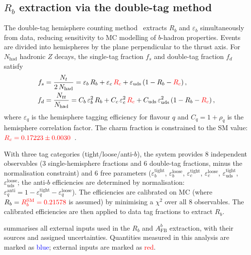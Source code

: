 \documentclass[11pt,a4paper]{article}
\newcommand{\measured}[1]{\textcolor{blue}{#1}}
\newcommand{\external}[1]{\textcolor{red}{#1}}
\begin{document}
\subsection{$R_b$ extraction via the double-tag method}
\label{sec:corrections:Rb}

The double-tag hemisphere counting method~\cite{LEP:HF:2001,ALEPH:Rb:1996}
extracts $R_b$ and $\varepsilon_b$ simultaneously from data,
reducing sensitivity to MC modelling of $b$-hadron properties.
Events are divided into hemispheres by the plane perpendicular to
the thrust axis.
For $N_\text{had}$ hadronic $Z$ decays, the single-tag fraction
$f_s$ and double-tag fraction $f_d$ satisfy
\begin{align}
f_s &= \frac{N_t}{2\,N_\text{had}} = \varepsilon_b\,R_b +
  \varepsilon_c\,\external{R_c} +
  \varepsilon_\text{uds}\,(1 - R_b - \external{R_c})\,,
\label{eq:fs} \\
f_d &= \frac{N_{tt}}{N_\text{had}} =
  C_b\,\varepsilon_b^2\,R_b +
  C_c\,\varepsilon_c^2\,\external{R_c} +
  C_\text{uds}\,\varepsilon_\text{uds}^2\,
  (1 - R_b - \external{R_c})\,,
\label{eq:fd}
\end{align}
where $\varepsilon_q$ is the hemisphere tagging efficiency for
flavour $q$ and $C_q = 1 + \rho_q$ is the hemisphere correlation
factor.
The charm fraction is constrained to the SM value:
$\external{R_c = 0.17223 \pm 0.0030}$~\cite{LEP:EWWG:2005}.

With three tag categories (tight/loose/anti-$b$), the system
provides 8 independent observables (3 single-hemisphere fractions
and 6 double-tag fractions, minus the normalisation constraint)
and 6 free parameters
($\varepsilon_b^\text{tight}$, $\varepsilon_b^\text{loose}$,
$\varepsilon_c^\text{tight}$, $\varepsilon_c^\text{loose}$,
$\varepsilon_\text{uds}^\text{tight}$, $\varepsilon_\text{uds}^\text{loose}$;
the anti-$b$ efficiencies are determined by normalisation:
$\varepsilon_q^\text{anti} = 1 - \varepsilon_q^\text{tight} - \varepsilon_q^\text{loose}$).
The efficiencies are calibrated on MC (where
$R_b = \external{R_b^\text{SM} = 0.21578}$ is assumed) by
minimising a $\chi^2$ over all 8 observables.
The calibrated efficiencies are then applied to data tag fractions
to extract $R_b$.

 summarises all external inputs used in
the $R_b$ and $A_\text{FB}^b$ extraction, with their sources and
assigned uncertainties.
Quantities measured in this analysis are marked as \measured{blue};
external inputs are marked as \external{red}.
\end{document}
